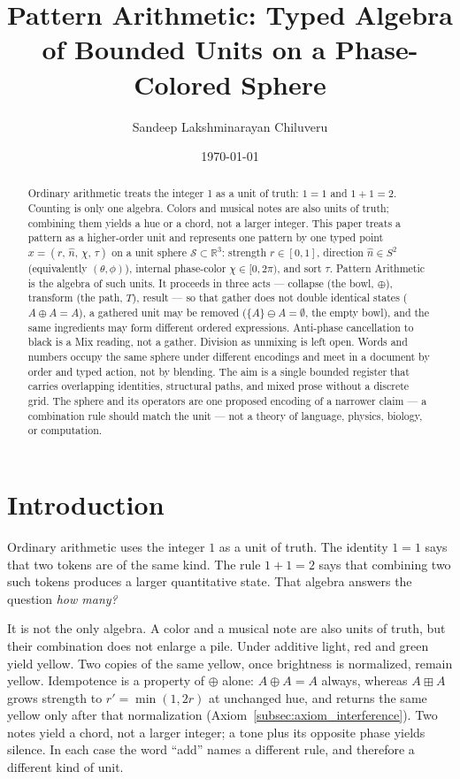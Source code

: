 \documentclass[12pt, a4paper]{article}
\title{Pattern Arithmetic: Typed Algebra of Bounded Units on a Phase-Colored Sphere}
\author{Sandeep Lakshminarayan Chiluveru}
\date{\today}
\begin{document}
\maketitle

\begin{abstract}
Ordinary arithmetic treats the integer 1 as a unit of truth: $1=1$ and $1+1=2$. Counting is only one algebra. Colors and musical notes are also units of truth; combining them yields a hue or a chord, not a larger integer. This paper treats a pattern as a higher-order unit and represents one pattern by one typed point
$x = (r,\,\hat n,\,\chi,\,\tau)$
on a unit sphere $\mathcal{S} \subset \mathbb{R}^3$:
strength $r \in [0, 1]$,
direction $\hat n \in S^2$ (equivalently $(\theta,\phi)$),
internal phase-color $\chi \in [0, 2\pi)$,
and sort $\tau$.
Pattern Arithmetic is the algebra of such units. It proceeds in three acts --- collapse (the bowl, $\oplus$), transform (the path, $T$), result --- so that gather does not double identical states ($A \oplus A = A$), a gathered unit may be removed ($\{A\} \ominus A = \emptyset$, the empty bowl), and the same ingredients may form different ordered expressions. Anti-phase cancellation to black is a Mix reading, not a gather. Division as unmixing is left open. Words and numbers occupy the same sphere under different encodings and meet in a document by order and typed action, not by blending. The aim is a single bounded register that carries overlapping identities, structural paths, and mixed prose without a discrete grid. The sphere and its operators are one proposed encoding of a narrower claim --- a combination rule should match the unit --- not a theory of language, physics, biology, or computation.
\end{abstract}

\section{Introduction}

Ordinary arithmetic uses the integer $1$ as a unit of truth.
The identity $1=1$ says that two tokens are of the same kind.
The rule $1+1=2$ says that combining two such tokens produces a
larger quantitative state. That algebra answers the question
\emph{how many?}

It is not the only algebra. A color and a musical note are also
units of truth, but their combination does not enlarge a pile.
Under additive light, red and green yield yellow. Two copies of
the same yellow, once brightness is normalized, remain yellow.
Idempotence is a property of $\oplus$ alone: $A\oplus A=A$ always,
whereas $A\boxplus A$ grows strength to $r'=\min(1,2r)$ at unchanged
hue, and returns the same yellow only after that normalization
(Axiom~\ref{subsec:axiom_interference}).
Two notes yield a chord, not a larger integer; a tone plus its
opposite phase yields silence. In each case the word ``add''
names a different rule, and therefore a different kind of unit.
\end{document}
